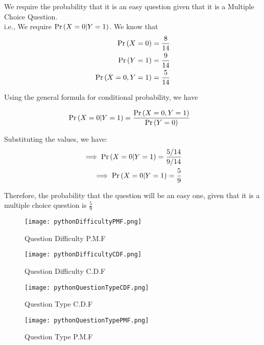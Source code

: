 \documentclass[journal,12pt,twocolumn]{IEEEtran}
\begin{document}
We require the probability that it is an easy question given that it is a Multiple Choice Question.\\
i.e., We require $\Pr\left(X = 0 | Y = 1\right)$. We know that
\begin{align}
    \Pr\left(X = 0\right) = \frac{8}{14}\\
    \Pr\left(Y = 1\right) = \frac{9}{14}\\
   \Pr\left(X = 0, Y = 1\right) = \frac{5}{14}
\end{align}


Using the general formula for conditional probability, we have 

\begin{align}
    &\Pr\left(X = 0 | Y = 1\right) = \frac{\Pr\left(X = 0, Y = 1\right)}{\Pr\left(Y = 0\right)}&
\end{align}

Substituting the values, we have:
\begin{align}
    \implies \Pr\left(X = 0 | Y = 1\right) = \frac{5/14}{9/14}\\
    \implies \Pr\left(X = 0 | Y = 1\right) = \frac{5}{9}
\end{align}

Therefore, the probability that the question will be an easy one, given that it is a multiple choice question is $\displaystyle\frac{5}{9}$

\begin{figure}[!ht]
       \centering
       \texttt{[image: pythonDifficultyPMF.png]}
       \label{fig:Question Difficulty PMF}
       \caption{Question Difficulty P.M.F}
\end{figure}

\begin{figure}[!ht]
       \centering
       \texttt{[image: pythonDifficultyCDF.png]}
       \caption{Question Difficulty C.D.F}
       \label{fig:Question Difficulty CDF}
\end{figure}

\begin{figure}[!ht]
       \centering
       \texttt{[image: pythonQuestionTypeCDF.png]}
       \caption{Question Type C.D.F}
       \label{fig:Question Type CDF}
\end{figure}

\begin{figure}[!ht]
       \centering
       \texttt{[image: pythonQuestionTypePMF.png]}
       \caption{Question Type P.M.F}
       \label{fig:Question Type PMF}
\end{figure}
\end{document}
